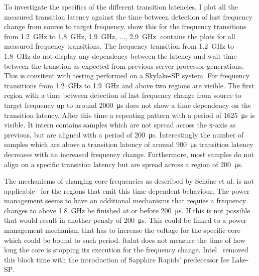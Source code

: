 To investigate the specifics of the different transition latencies, I plot all the measured transition latency against the time between detection of last frequency change from source to target frequency.
 show this for the frequency transitions from \SI{1.2}{\GHz} to \SI{1.8}{\GHz}, \SI{1.9}{\GHz}, ..., \SI{2.9}{\GHz}.
 contains the plots for all measured frequency transitions.
The frequency transition from \SI{1.2}{\GHz} to \SI{1.8}{\GHz} do not display any dependency between the latency and wait time between the transtion as expected from previous server processor generations.
This is consitent with testing performed on a Skylake-SP system.
For frequency transitions from \SI{1.2}{\GHz} to \SI{1.9}{\GHz} and above two regions are visible.
The first region with a time between detection of last frequency change from source to target frequency up to around \SI{2000}{\us} does not show a time dependency on the transition latency.
After this time a repeating pattern with a period of \SI{1625}{\us} is visible.
It intern contains samples which are not spread across the x-axis as previous, but are aligned with a period of \SI{200}{\us}.
Interestingly the number of samples which are above a transition latency of around \SI{900}{\us} transition latency decreases with an increased frequency change.
Furthermore, most samples do not align on a specific transition latency but are spread across a region of \SI{200}{\us}.

The mechanisms of changing core frequencies as described by Schöne et al. is not applicable~\cite{Schoene_2019_SKL} for the regions that emit this time dependent behaviour.
The power management seems to have an additional mechanisms that requies a frequency changes to above \SI{1.8}{\GHz} be finished at or before \SI{200}{\us}.
If this is not possible that would result in another penaly of \SI{200}{\us}.
This could be linked to a power management mechanism that has to increase the voltage for the specific core which could be bound to such period.
ftalat does not measure the time of how long the core is stopping its execution for the frequency change.
Intel~\cite{Intel_2020_IceLake_SP} removed this block time with the introduction of Sapphire Rapids' predecessor Ice Lake-SP.

